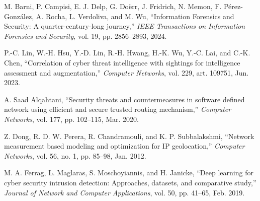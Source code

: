 \begin{thebibliography}{9}
M. Barni, P. Campisi, E. J. Delp, G. Doërr, J. Fridrich, N. Memon, F. Pérez-González, A. Rocha, L. Verdoliva, and M. Wu, ``Information Forensics and Security: A quarter-century-long journey,'' \textit{IEEE Transactions on Information Forensics and Security}, vol. 19, pp. 2856--2893, 2024.

P.-C. Lin, W.-H. Hsu, Y.-D. Lin, R.-H. Hwang, H.-K. Wu, Y.-C. Lai, and C.-K. Chen, ``Correlation of cyber threat intelligence with sightings for intelligence assessment and augmentation,'' \textit{Computer Networks}, vol. 229, art. 109751, Jun. 2023.

A. Saad Alqahtani, ``Security threats and countermeasures in software defined network using efficient and secure trusted routing mechanism,'' \textit{Computer Networks}, vol. 177, pp. 102--115, Mar. 2020.

Z. Dong, R. D. W. Perera, R. Chandramouli, and K. P. Subbalakshmi, ``Network measurement based modeling and optimization for IP geolocation,'' \textit{Computer Networks}, vol. 56, no. 1, pp. 85--98, Jan. 2012.

M. A. Ferrag, L. Maglaras, S. Moschoyiannis, and H. Janicke, ``Deep learning for cyber security intrusion detection: Approaches, datasets, and comparative study,'' \textit{Journal of Network and Computer Applications}, vol. 50, pp. 41--65, Feb. 2019.
\end{thebibliography}
